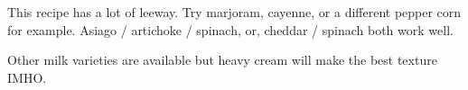\begin{variation}
\item This recipe has a lot of leeway. Try marjoram, cayenne, or a different pepper corn for example. Asiago / artichoke / spinach, or, cheddar / spinach both work well.
\item Other milk varieties are available but heavy cream will make the best texture IMHO.
\end{variation}


\recipeend
